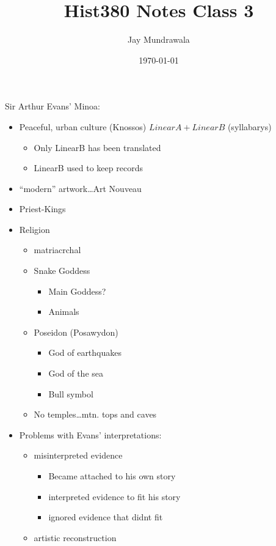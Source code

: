 \documentclass[11pt, a4paper]{article}
\begin{document}
\title{Hist380 Notes Class 3}
\author{Jay Mundrawala}
\date{\today}
\maketitle

Sir Arthur Evans' Minoa:
\begin{itemize}
  \item Peaceful, urban culture (Knossos)
    $LinearA+LinearB$ (syllabarys)
    \begin{itemize}
      \item Only LinearB has been translated
      \item LinearB used to keep records
    \end{itemize}
  \item ``modern'' artwork\dots Art Nouveau
  \item Priest-Kings
  \item Religion
    \begin{itemize}
      \item matriacrchal
      \item Snake Goddess
        \begin{itemize}
          \item Main Goddess?
          \item Animals
        \end{itemize}
      \item Poseidon (Posawydon)
        \begin{itemize}
          \item God of earthquakes
          \item God of the sea
          \item Bull symbol
        \end{itemize}
      \item No temples\dots mtn. tops and caves
    \end{itemize}
  \item Problems with Evans' interpretations:
    \begin{itemize}
      \item misinterpreted evidence
        \begin{itemize}
          \item Became attached to his own story
          \item interpreted evidence to fit his story
          \item ignored evidence that didnt fit
        \end{itemize}
      \item artistic reconstruction

\end{itemize}
\end{itemize}
\end{document}
